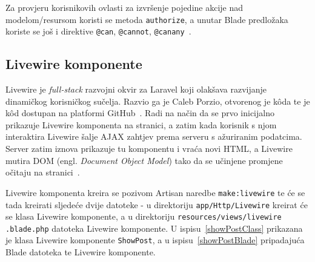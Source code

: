 Za provjeru korisnikovih ovlasti za izvršenje pojedine akcije nad modelom/resursom koristi se metoda \texttt{authorize}, a unutar Blade predložaka koriste se još i direktive \texttt{@can}, \texttt{@cannot}, \texttt{@canany}~\cite{authorization}.

\subsection{Livewire komponente}
Livewire je \textit{full-stack} razvojni okvir za Laravel koji olakšava razvijanje dinamičkog korisničkog sučelja. Razvio ga je Caleb Porzio, otvorenog je k\^oda te je k\^od dostupan na platformi GitHub~\cite{livewireGithub}. Radi na način da se prvo inicijalno prikazuje Livewire komponenta na stranici, a zatim kada korisnik s njom interaktira Livewire šalje AJAX zahtjev prema serveru s ažuriranim podatcima. Server zatim iznova prikazuje tu komponentu i vraća novi HTML, a Livewire mutira DOM (engl. \textit{Document Object Model}) tako da se učinjene promjene očitaju na stranici~\cite{livewire}.

Livewire komponenta kreira se pozivom Artisan naredbe \texttt{make:livewire} te će se tada kreirati sljedeće dvije datoteke - u direktoriju \texttt{app/Http/Livewire} kreirat će se klasa Livewire komponente, a u direktoriju \texttt{resources/views/livewire} \texttt{.blade.php} datoteka Livewire komponente. U ispisu~\ref{showPostClass} prikazana je klasa Livewire komponente \texttt{ShowPost}, a u ispisu~\ref{showPostBlade} pripadajuća Blade datoteka te Livewire komponente.

